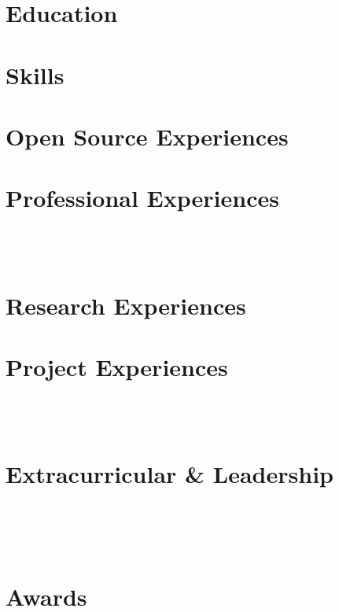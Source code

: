\documentclass[a4paper,8pt]{article}
\begin{document}


\section{Education}


\section{Skills}


\section{Open Source Experiences}



\section{Professional Experiences}

\\ [2pt]

\\ [2pt]


\section{Research Experiences}


\section{Project Experiences}

\\ [2pt]

\\ [2pt]


\section{Extracurricular \& Leadership}

\\ [2pt]

\\ [2pt]

\\ [2pt]


\section{Awards}

\end{document}
